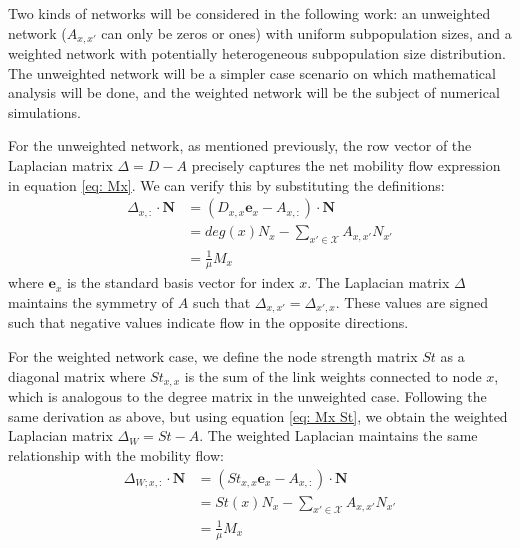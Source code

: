 Two kinds of networks will be considered in the following work: an unweighted network ($A_{x,x'}$ can only be zeros or ones) with uniform subpopulation sizes, and a weighted network with potentially heterogeneous subpopulation size distribution. The unweighted network will be a simpler case scenario on which mathematical analysis will be done, and the weighted network will be the subject of numerical simulations.

For the unweighted network, as mentioned previously, the row vector of the Laplacian matrix $\Delta = D - A$ precisely captures the net mobility flow expression in equation \ref{eq: Mx}. We can verify this by substituting the definitions:
\begin{equation}
    \begin{aligned}
        \Delta_{x,:} \cdot \mathbf{N} &= (D_{x,x} \mathbf{e}_x - A_{x,:}) \cdot \mathbf{N} \\
        &= deg(x)N_x - \sum_{x' \in \mathcal{X}} A_{x,x'}N_{x'} \\
        &= \frac{1}{\mu}M_x
    \end{aligned}
\end{equation}
where $\mathbf{e}_x$ is the standard basis vector for index $x$. The Laplacian matrix $\Delta$ maintains the symmetry of $A$ such that $\Delta_{x,x'} = \Delta_{x',x}$. These values are signed such that negative values indicate flow in the opposite directions.

For the weighted network case, we define the node strength matrix $St$ as a diagonal matrix where $St_{x,x}$ is the sum of the link weights connected to node $x$, which is analogous to the degree matrix in the unweighted case. Following the same derivation as above, but using equation \ref{eq: Mx St}, we obtain the weighted Laplacian matrix $\Delta_W = St - A$. The weighted Laplacian maintains the same relationship with the mobility flow:
\begin{equation}
    \begin{aligned}
        \Delta_{W;x,:} \cdot \mathbf{N} &= (St_{x,x} \mathbf{e}_x - A_{x,:}) \cdot \mathbf{N} \\
        &= St(x)N_x - \sum_{x' \in \mathcal{X}} A_{x,x'}N_{x'} \\
        &= \frac{1}{\mu}M_x
    \end{aligned}
\end{equation}

